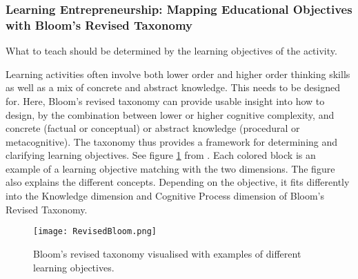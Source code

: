 


%


  \subsubsection{Learning Entrepreneurship: Mapping Educational Objectives with Bloom's Revised Taxonomy}

  What to teach should be determined by the learning objectives of the activity.

  Learning activities often involve both lower order and higher order thinking skills as well as a mix of concrete and abstract knowledge. This needs to be designed for. Here, Bloom's revised taxonomy can provide usable insight into how to design, by the combination between lower or higher cognitive complexity, and concrete (factual or conceptual) or abstract knowledge (procedural or metacognitive). \cite{cheong} The taxonomy thus provides a framework for determining and clarifying learning objectives. See figure \ref{fig:revised-bloom} from \cite{heer}. Each colored block is an example of a learning objective matching with the two dimensions. The figure also explains the different concepts. Depending on the objective, it fits differently into the Knowledge dimension and Cognitive Process dimension of Bloom's Revised Taxonomy. \cite{bloom}

  \begin{figure}[h]
    \centering
    \texttt{[image: RevisedBloom.png]}
    \caption{Bloom's revised taxonomy visualised with examples of different learning objectives.}
    \label{fig:revised-bloom}
\end{figure}

